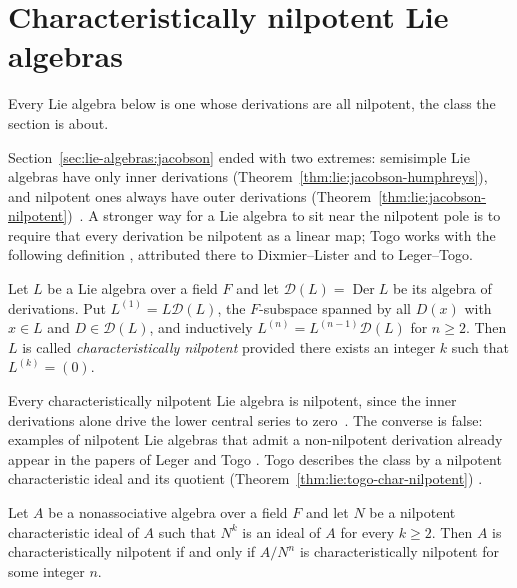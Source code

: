 \section{Characteristically nilpotent Lie algebras}\label{sec:lie-algebras:characteristically-nilpotent}

Every Lie algebra below is one whose derivations are all nilpotent, the class
the section is about.

Section~\ref{sec:lie-algebras:jacobson} ended with two extremes:
semisimple Lie algebras have only inner derivations
(Theorem~\ref{thm:lie:jacobson-humphreys}), and nilpotent ones always have
outer derivations (Theorem~\ref{thm:lie:jacobson-nilpotent})~\cite[p.~209]{Togo1969}.  A stronger
way for a Lie algebra to sit near the nilpotent pole is to require that
every derivation be nilpotent as a linear map; Togo works with the
following definition \cite[p.~209]{Togo1969}, attributed there to
Dixmier--Lister and to Leger--Togo.

\begin{definition}\label{def:lie:char-nilpotent}
Let $L$ be a Lie algebra over a field $F$ and let
$\mathcal{D}(L)=\operatorname{Der} L$ be its algebra of derivations.  Put
$L^{(1)}=L\mathcal{D}(L)$, the $F$-subspace spanned by all $D(x)$ with
$x\in L$ and $D\in\mathcal{D}(L)$, and inductively
$L^{(n)}=L^{(n-1)}\mathcal{D}(L)$ for $n\geq 2$.  Then $L$ is called
\emph{characteristically nilpotent} provided there exists an integer $k$
such that $L^{(k)}=(0)$.
\end{definition}

Every characteristically nilpotent Lie algebra is nilpotent, since the inner
derivations alone drive the lower central series to zero~\cite[Theorem, p.~210]{Togo1969}.  The converse is
false: examples of nilpotent Lie algebras that admit a non-nilpotent
derivation already appear in the papers of Leger and Togo
\cite[p.~209]{Togo1969}.  Togo describes the class by a nilpotent
characteristic ideal and its quotient (Theorem~\ref{thm:lie:togo-char-nilpotent})
\cite[Theorem, p.~210]{Togo1969}.\begin{theorem}\label{thm:lie:togo-char-nilpotent}
Let $A$ be a nonassociative algebra over a field $F$ and let $N$ be a
nilpotent characteristic ideal of $A$ such that $N^{k}$ is an ideal of $A$
for every $k\geq 2$.  Then $A$ is characteristically nilpotent if and only
if $A/N^{n}$ is characteristically nilpotent for some integer $n$.
\end{theorem}

